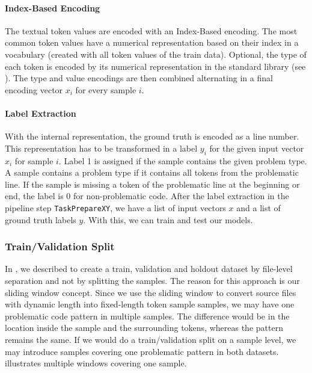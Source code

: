 \paragraph{Index-Based Encoding}
The textual token values are encoded with an Index-Based encoding. The most common token values have a numerical representation based on their index in a vocabulary (created with all token values of the train data). Optional, the type of each token is encoded by its numerical representation in the standard library (see ). The type and value encodings are then combined alternating in a final encoding vector $x_i$ for every sample $i$.
\paragraph{Label Extraction}
With the internal representation, the ground truth is encoded as a line number. This representation has to be transformed in a label $y_i$ for the given input vector $x_i$ for sample $i$. Label 1 is assigned if the sample contains the given problem type. A sample contains a problem type if it contains all tokens from the problematic line. If the sample is missing a token of the problematic line at the beginning or end, the label is 0 for non-problematic code.
After the label extraction in the pipeline step \texttt{TaskPrepareXY}, we have a list of input vectors $x$ and a list of ground truth labels $y$. With this, we can train and test our models.

\subsubsection{Train/Validation Split}\label{sec:train_test_split}
In , we described to create a train, validation and holdout dataset by file-level separation and not by splitting the samples. The reason for this approach is our sliding window concept. Since we use the sliding window to convert source files with dynamic length into fixed-length token sample samples, we may have one problematic code pattern in multiple samples. The difference would be in the location inside the sample and the surrounding tokens, whereas the pattern remains the same.
If we would do a train/validation split on a sample level, we may introduce samples covering one problematic pattern in both datasets.  illustrates multiple windows covering one sample. 

